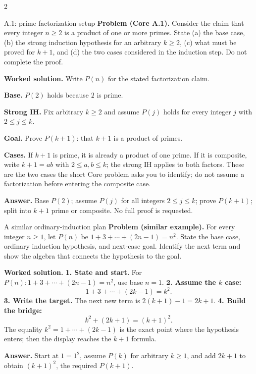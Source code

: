 \documentclass[10pt]{article}
\begin{document}
\begin{multicols}{2}
\columnbreak

\begin{workedbox}{A.1: prime factorization setup}
\textbf{Problem (Core A.1).} Consider the claim that every integer
$n\ge2$ is a product of one or more primes. State (a) the base case,
(b) the strong induction hypothesis for an arbitrary $k\ge2$,
(c) what must be proved for $k+1$, and (d) the two cases considered in the
induction step. Do not complete the proof.

\textbf{Worked solution.} Write $P(n)$ for the stated factorization claim.

\textbf{Base.} $P(2)$ holds because $2$ is prime.

\textbf{Strong IH.} Fix arbitrary $k\ge2$ and assume $P(j)$ holds for every
integer $j$ with $2\le j\le k$.

\textbf{Goal.} Prove $P(k+1)$: that $k+1$ is a product of primes.

\textbf{Cases.} If $k+1$ is prime, it is already a product of one prime. If
it is composite, write $k+1=ab$ with $2\le a,b\le k$; the strong IH applies
to both factors. These are the two cases the short Core problem asks you to
identify; do not assume a factorization before entering the composite case.

\textbf{Answer.} Base $P(2)$; assume $P(j)$ for all integers $2\le j\le k$;
prove $P(k+1)$; split into $k+1$ prime or composite. No full proof is requested.
\end{workedbox}

\begin{workedbox}{A similar ordinary-induction plan}
\textbf{Problem (similar example).} For every integer $n\ge1$, let
$P(n)$ be $1+3+\cdots+(2n-1)=n^2$. State the base case, ordinary induction
hypothesis, and next-case goal. Identify the next term and show the algebra
that connects the hypothesis to the goal.

\textbf{Worked solution.}
\textbf{1. State and start.} For
$P(n):1+3+\cdots+(2n-1)=n^2$, use base $n=1$.
\textbf{2. Assume the $k$ case:}
\[
1+3+\cdots+(2k-1)=k^2.
\]
\textbf{3. Write the target.} The next new term is
$2(k+1)-1=2k+1$. \textbf{4. Build the bridge:}
\[
k^2+(2k+1)=(k+1)^2.
\]
The equality $k^2=1+\cdots+(2k-1)$ is the exact point where the hypothesis
enters; then the display reaches the $k+1$ formula.

\textbf{Answer.} Start at $1=1^2$, assume $P(k)$ for arbitrary $k\ge1$,
and add $2k+1$ to obtain $(k+1)^2$, the required $P(k+1)$.
\end{workedbox}


\end{multicols}
\end{document}
